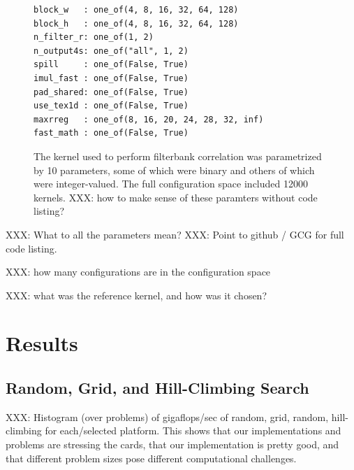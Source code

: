 \documentclass{sig-alternate}
\begin{document}
\begin{figure}
\begin{center}
\begin{minipage}{.43\textwidth}
\begin{verbatim}
block_w   : one_of(4, 8, 16, 32, 64, 128)
block_h   : one_of(4, 8, 16, 32, 64, 128)
n_filter_r: one_of(1, 2)
n_output4s: one_of("all", 1, 2)
spill     : one_of(False, True)
imul_fast : one_of(False, True)
pad_shared: one_of(False, True)
use_tex1d : one_of(False, True)
maxrreg   : one_of(8, 16, 20, 24, 28, 32, inf)
fast_math : one_of(False, True)
\end{verbatim}
\end{minipage}
\end{center}
\caption{The kernel used to perform
filterbank correlation was parametrized by 10 parameters, some of which
were binary and others of which were integer-valued. The full configuration
space included 12000 kernels.
XXX: how to make sense of these paramters without code listing?
}
\end{figure}

XXX: What to all the parameters mean?
XXX: Point to github / GCG for full code listing.

XXX: how many configurations are in the configuration space

XXX: what was the reference kernel, and how was it chosen?

\section{Results}

\subsection{Random, Grid, and Hill-Climbing Search}

XXX: Histogram (over problems) of gigaflops/sec of random, grid, random,
hill-climbing for each/selected platform.
This shows that our implementations and problems are stressing the cards,
that our implementation is pretty good, and that different problem sizes pose
different computational challenges.
\end{document}
